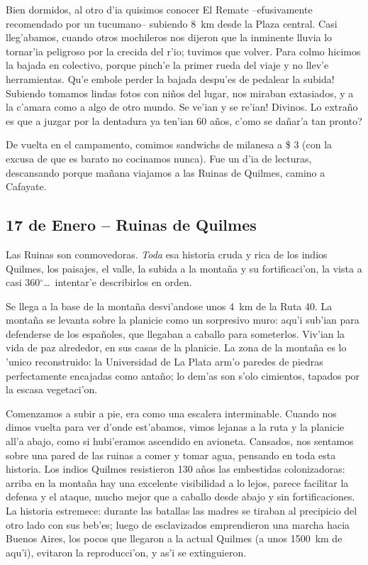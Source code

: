 Bien dormidos, al otro d'ia quisimos conocer El Remate --efusivamente
recomendado por un tucumano-- subiendo 8~km desde la Plaza central. Casi
lleg'abamos, cuando otros mochileros nos dijeron que la inminente lluvia lo
tornar'ia peligroso por la crecida del r'io; tuvimos que volver. Para colmo
hicimos la bajada en colectivo, porque pinch'e la primer rueda del viaje y no
llev'e herramientas. \textexclamdown Qu'e embole perder la bajada despu'es de
pedalear la subida! Subiendo tomamos lindas fotos con ni\~nos del lugar, nos
miraban extasiados, y a la c'amara como a algo de otro mundo. \textexclamdown Se
ve'ian y se re'ian! Divinos. Lo extra\~no es que a juzgar por la dentadura ya
ten'ian 60 a\~nos, \textquestiondown c'omo se da\~nar'a tan pronto?

De vuelta en el campamento, comimos sandwichs de milanesa a \$ 3 (con la excusa
de que es barato no cocinamos nunca). Fue un d'ia de lecturas, descansando
porque ma\~nana viajamos a las Ruinas de Quilmes, camino a Cafayate.

\subsection*{17 de Enero -- Ruinas de Quilmes}

Las Ruinas son conmovedoras. \emph{Toda} esa historia cruda y rica de los indios
Quilmes, los paisajes, el valle, la subida a la monta\~na y su fortificaci'on,
la vista a casi 360$^\circ$\ldots\ intentar'e describirlos en orden.

Se llega a la base de la monta\~na desvi'andose unos 4~km de la Ruta 40. La
monta\~na se levanta sobre la planicie como un sorpresivo muro: aqu'i sub'ian
para defenderse de los espa\~noles, que llegaban a caballo para someterlos.
Viv'ian la vida de paz alrededor, en sus casas de la planicie. La zona de la
monta\~na es lo 'unico reconstruido: la Universidad de La Plata arm'o paredes de
piedras perfectamente encajadas como anta\~no; lo dem'as son s'olo cimientos,
tapados por la escasa vegetaci'on.

Comenzamos a subir a pie, era como una escalera interminable. Cuando nos dimos
vuelta para ver d'onde est'abamos, vimos lejanas a la ruta y la planicie all'a
abajo, como si hubi'eramos ascendido en avioneta. Cansados, nos sentamos sobre
una pared de las ruinas a comer y tomar agua, pensando en toda esta historia.
Los indios Quilmes resistieron 130 a\~nos las embestidas colonizadoras: arriba
en la monta\~na hay una excelente visibilidad a lo lejos, parece facilitar la
defensa y el ataque, mucho mejor que a caballo desde abajo y sin
fortificaciones. La historia estremece: durante las batallas las madres se
tiraban al precipicio del otro lado con sus beb'es; luego de esclavizados
emprendieron una marcha hacia Buenos Aires, los pocos que llegaron a la actual
Quilmes (a unos 1500~km de aqu'i), evitaron la reproducci'on, y as'i se
extinguieron.

